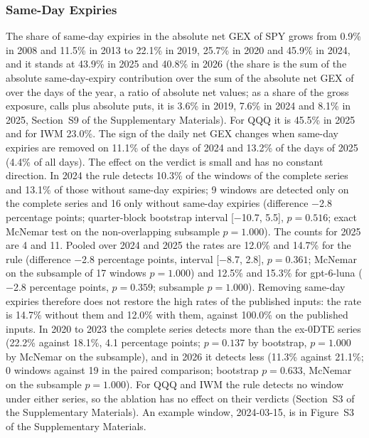 \subsubsection{Same-Day Expiries}
\label{sec:results:ablation}
The share of same-day expiries in the absolute net GEX of SPY grows from 0.9\% in 2008 and 11.5\% in 2013 to 22.1\% in 2019, 25.7\% in 2020 and 45.9\% in 2024, and it stands at 43.9\% in 2025 and 40.8\% in 2026 (the share is the sum of the absolute same-day-expiry contribution over the sum of the absolute net GEX of  over the days of the year, a ratio of absolute net values; as a share of the gross exposure, calls plus absolute puts, it is 3.6\% in 2019, 7.6\% in 2024 and 8.1\% in 2025, Section~S9 of the Supplementary Materials). For QQQ it is 45.5\% in 2025 and for IWM 23.0\%. The sign of the daily net GEX changes when same-day expiries are removed on 11.1\% of the days of 2024 and 13.2\% of the days of 2025 (4.4\% of all days). The effect on the verdict is small and has no constant direction. In 2024 the rule detects 10.3\% of the windows of the complete series and 13.1\% of those without same-day expiries; 9 windows are detected only on the complete series and 16 only without same-day expiries (difference $-$2.8 percentage points; quarter-block bootstrap interval [$-$10.7, 5.5], $p=0.516$; exact McNemar test on the non-overlapping subsample $p=1.000$). The counts for 2025 are 4 and 11. Pooled over 2024 and 2025 the rates are 12.0\% and 14.7\% for the rule (difference $-$2.8 percentage points, interval [$-$8.7, 2.8], $p=0.361$; McNemar on the subsample of 17 windows $p=1.000$) and 12.5\% and 15.3\% for gpt-6-luna ($-$2.8 percentage points, $p=0.359$; subsample $p=1.000$). Removing same-day expiries therefore does not restore the high rates of the published inputs: the rate is 14.7\% without them and 12.0\% with them, against 100.0\% on the published inputs. In 2020 to 2023 the complete series detects more than the ex-0DTE series (22.2\% against 18.1\%, 4.1 percentage points; $p=0.137$ by bootstrap, $p=1.000$ by McNemar on the subsample), and in 2026 it detects less (11.3\% against 21.1\%; 0 windows against 19 in the paired comparison; bootstrap $p=0.633$, McNemar on the subsample $p=1.000$). For QQQ and IWM the rule detects no window under either series, so the ablation has no effect on their verdicts (Section~S3 of the Supplementary Materials). An example window, 2024-03-15, is in Figure~S3 of the Supplementary Materials.
